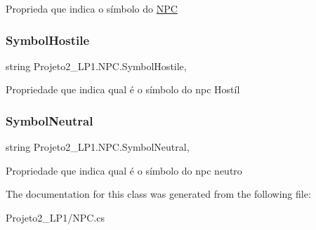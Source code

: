 Proprieda que indica o símbolo do \mbox{\hyperlink{class_projeto2___l_p1_1_1_n_p_c}{N\+PC}} 

\mbox{\label{class_projeto2___l_p1_1_1_n_p_c_ad5df0c2b90e709c205cdac72a2d535f6}} 
\subsubsection{\texorpdfstring{Symbol\+Hostile}{SymbolHostile}}
{\footnotesize\ttfamily string Projeto2\+\_\+\+L\+P1.\+N\+P\+C.\+Symbol\+Hostile\hspace{0.3cm}{\ttfamily [get]}, {\ttfamily [set]}}



Propriedade que indica qual é o símbolo do npc Hostíl 

\mbox{\label{class_projeto2___l_p1_1_1_n_p_c_a0e1847744e4e9042beab9c08c7b93b74}} 
\subsubsection{\texorpdfstring{Symbol\+Neutral}{SymbolNeutral}}
{\footnotesize\ttfamily string Projeto2\+\_\+\+L\+P1.\+N\+P\+C.\+Symbol\+Neutral\hspace{0.3cm}{\ttfamily [get]}, {\ttfamily [set]}}



Propriedade que indica qual é o símbolo do npc neutro 



The documentation for this class was generated from the following file\+:\begin{DoxyCompactItemize}
\item 
Projeto2\+\_\+\+L\+P1/N\+P\+C.\+cs\end{DoxyCompactItemize}
